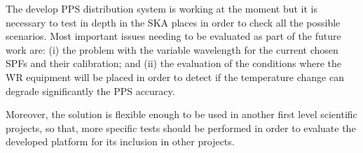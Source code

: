 The develop PPS distribution system is working at the moment but it is 
necessary to test in depth in the SKA places in order to check all the 
possible scenarios. Most important issues needing to be evaluated as part of 
the future work are: (i) the problem with the variable wavelength for the 
current chosen SPFs and their calibration; and (ii) the evaluation of the 
conditions where the WR equipment will be placed in order to detect if the 
temperature change can degrade significantly the PPS accuracy.

Moreover, the solution is flexible enough to be used in another first level 
scientific projects, so that, more specific tests should be performed in order 
to evaluate the developed platform for its inclusion in other projects.